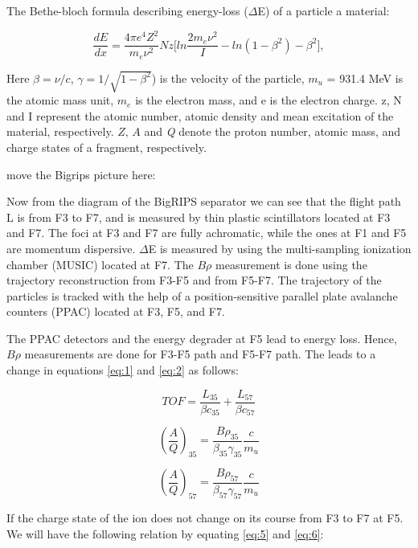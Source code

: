 The Bethe-bloch formula describing energy-loss ($\Delta$E) of a particle a material:

\begin{equation}\label{eq:3}
\frac{dE}{dx}=\frac{4\pi e^{4}Z^{2}}{m_{e} \nu^{2}} Nz \Bigg[ ln \frac{2m_{e} \nu^{2}}{I} -ln(1-\beta^2) -\beta^{2}\Bigg],
\end{equation}


Here $\beta=\nu/c$, $\gamma = 1/ \sqrt{1-\beta^2}$) is the velocity of the particle, $m_{u}$ = 931.4 MeV is the atomic mass unit, $m_{e}$ is the electron mass, and e is the electron charge. z, N and I represent the atomic number, atomic density and mean excitation of the material, respectively. $\textit{Z, A}$ and \textit{Q} denote the proton number, atomic mass, and charge states of a fragment, respectively.


move the Bigrips picture here:

Now from the diagram of the BigRIPS separator we can see that the flight path L is from F3 to F7, and is measured by thin plastic scintillators located at F3 and F7. The foci at F3 and F7 are fully achromatic, while the ones at F1 and F5 are momentum dispersive. $\Delta$E is measured by using the multi-sampling ionization chamber (MUSIC) located at F7. The $B \rho$ measurement is done using the trajectory reconstruction from F3-F5 and from F5-F7. The trajectory of the particles is tracked with the help of a position-sensitive parallel plate avalanche counters (PPAC) located at F3, F5, and F7. 

The PPAC detectors and the energy degrader at F5 lead to energy loss. Hence, $B \rho$ measurements are done for F3-F5 path and F5-F7 path. The leads to a change in equations \ref{eq:1} and \ref{eq:2} as follows:

\begin{equation} \label{eq:4}
TOF = \frac{L_{35}}{\beta c_{35}} + \frac{L_{57}}{\beta c_{57}}
\end{equation}


\begin{equation}\label{eq:5}
\left (\frac{A}{Q} \right)_{35} = \frac{B \rho_{35}}{\beta_{35} \gamma_{35}} \frac{c}{m_{u}}
\end{equation}


\begin{equation}\label{eq:6}
\left (\frac{A}{Q} \right)_{57} = \frac{B \rho_{57}}{\beta_{57} \gamma_{57}} \frac{c}{m_{u}}
\end{equation}


If the charge state of the ion does not change on its course from F3 to F7 at F5. We will have the following relation by equating \ref{eq:5} and \ref{eq:6}: 


